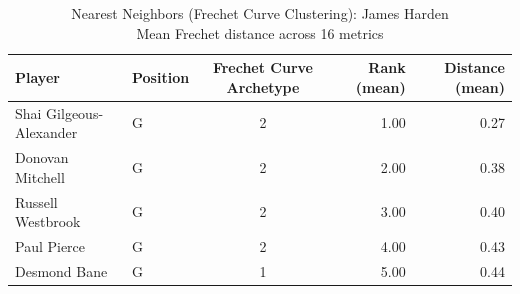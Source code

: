 \begin{table}[t]
\caption*{
{\fontsize{20}{25} Nearest Neighbors (Frechet Curve Clustering): James Harden\fontsize{12}{15}\selectfont } \\ 
{\fontsize{14}{17}\selectfont  Mean Frechet distance across 16 metrics\fontsize{12}{15}\selectfont }
} 
\fontsize{12.0pt}{14.0pt}\selectfont
\begin{tabular*}{\linewidth}{@{\extracolsep{\fill}}llcrr}
\toprule
Player & Position & Frechet Curve Archetype & Rank (mean) & Distance (mean) \\ 
\midrule\addlinespace[2.5pt]
Shai Gilgeous-Alexander & G & 2 & 1.00 & 0.27 \\ 
Donovan Mitchell & G & 2 & 2.00 & 0.38 \\ 
Russell Westbrook & G & 2 & 3.00 & 0.40 \\ 
Paul Pierce & G & 2 & 4.00 & 0.43 \\ 
Desmond Bane & G & 1 & 5.00 & 0.44 \\ 
\bottomrule
\end{tabular*}
\end{table}

